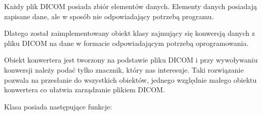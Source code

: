
\par
Każdy plik DICOM posiada zbiór elementów danych.
Elementy danych posiadają zapisane dane, ale w sposób nie odpowiadający potrzebą programu.

\par
Dlatego został zaimplementowany obiekt klasy  zajmujący się konwersją danych z pliku DICOM na dane w formacie odpowiadającym potrzebą oprogramowania.

\par
Obiekt konwertera jest tworzony na podstawie pliku DICOM i przy wywoływaniu konwersji należy podać tylko znacznik, który nas interesuje.
Taki rozwiązanie pozwala na przesłanie do wszystkich obiektów, jednego względnie małego obiektu konwertera co ułatwia zarządzanie plikiem DICOM.

\par
Klasa  posiada następujące funkcje:
